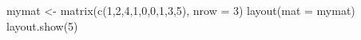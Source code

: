 \begin{Schunk}
\begin{Sinput}
 mymat <- matrix(c(1,2,4,1,0,0,1,3,5), nrow = 3)
 layout(mat = mymat)
 layout.show(5)
\end{Sinput}
\end{Schunk}
